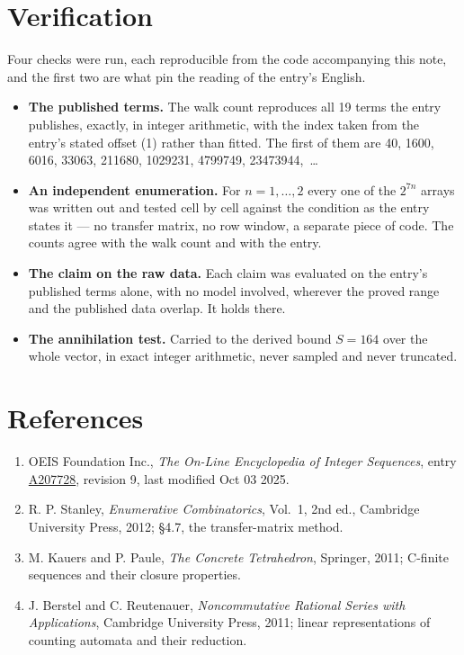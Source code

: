 \documentclass[11pt]{article}
\theoremstyle{definition}
\begin{document}
\section{Verification}

Four checks were run, each reproducible from the code accompanying this note, and the first two are what pin the reading of the entry's English.

\begin{itemize}

\item {\bfseries The published terms.} The walk count reproduces all 19 terms the entry publishes, exactly, in integer arithmetic, with the index taken from the entry's stated offset (1) rather than fitted. The first of them are 40, 1600, 6016, 33063, 211680, 1029231, 4799749, 23473944,~\dots

\item {\bfseries An independent enumeration.} For $n = 1,\dots,2$ every one of the $2^{7n}$ arrays was written out and tested cell by cell against the condition as the entry states it --- no transfer matrix, no row window, a separate piece of code. The counts agree with the walk count and with the entry.

\item {\bfseries The claim on the raw data.} Each claim was evaluated on the entry's published terms alone, with no model involved, wherever the proved range and the published data overlap. It holds there.

\item {\bfseries The annihilation test.} Carried to the derived bound $S = 164$ over the whole vector, in exact integer arithmetic, never sampled and never truncated.

\end{itemize}

\section{References}

\begin{enumerate}

\item OEIS Foundation Inc., \emph{The On-Line Encyclopedia of Integer Sequences}, entry \href{https://oeis.org/A207728}{A207728}, revision 9, last modified Oct 03 2025.

\item R. P. Stanley, \emph{Enumerative Combinatorics}, Vol.~1, 2nd ed., Cambridge University Press, 2012; \S4.7, the transfer-matrix method.

\item M. Kauers and P. Paule, \emph{The Concrete Tetrahedron}, Springer, 2011; C-finite sequences and their closure properties.

\item J. Berstel and C. Reutenauer, \emph{Noncommutative Rational Series with Applications}, Cambridge University Press, 2011; linear representations of counting automata and their reduction.

\end{enumerate}
\end{document}
